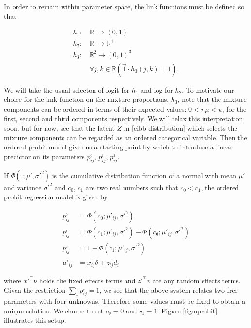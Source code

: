 In order to remain within parameter space, the link functions must be defined so that

\begin{equation}
\begin{split}
h_1:&\: \mathbb R\; \to (0,1)\\
h_2:&\: \mathbb R\; \to \mathbb R^+\\
h_3:&\: \mathbb R^2 \to (0,1)^3\\
&\: \forall j,k \in \mathbb R \left( \vec 1 \cdot h_3(j,k) = 1 \right).
\end{split}
\label{link-definitions}
\end{equation}

We will take the usual selecton of logit for $h_1$ and log for $h_2$. To motivate our choice for the link function on the mixture proportions, $h_3$, note that the mixture components can be ordered in terms of their expected values: $0<n\mu<n$, for the first, second and third components respectively. We will relax this interpretation soon, but for now, see that the latent $Z$ in \ref{eibb-distribution} which selects the mixture components can be regarded as an ordered categorical variable. Then the ordered probit model gives us a starting point by which to introduce a linear predictor on its parameters $p_{ij}^{_0}$, $p_{ij}^{_1}$, $p_{ij}^{_2}$.

If $\Phi(.;\mu',\sigma'^2)$ is the cumulative distribution function of a normal with mean $\mu'$ and variance $\sigma'^2$ and $c_0$, $c_1$ are two real numbers such that $c_0 < c_1$, the ordered probit regression model is given by

\begin{equation}
\begin{split}
p^{_0}_{ij} &= \Phi(c_0;\mu'_{ij},\sigma'^{2}) \\
p^{_1}_{ij} &= \Phi(c_1;\mu'_{ij},\sigma'^{2}) - \Phi(c_0;\mu'_{ij},\sigma'^{2})\\
p^{_2}_{ij} &= 1 - \Phi(c_1;\mu'_{ij},\sigma'^{2})\\
\mu'_{ij} &= \dot{x}_{ij}^{\top} \dot{\delta}+\dot{z}_{ij}^{\top} \dot{d}_i
\end{split}
\label{eq:oprobit}
\end{equation}

where $x'^\top \nu$ holds the fixed effects terms and $z'^\top v$ are any random effects terms. Given the restriction $\sum_s p_{ij}^{_s} = 1$, we see that the above system relates two free parameters with four unknowns. Therefore some values must be fixed to obtain a unique solution. We choose to set $c_0 = 0$ and $c_1 = 1$. Figure \ref{fig:oprobit} illustrates this setup.

